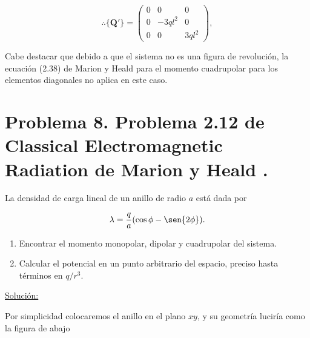\documentclass[a4paper,11pt]{article}
\numberwithin{equation}{section}
\begin{document}
\begin{equation}
 \therefore \{ \mathbf{Q'} \} = \begin{pmatrix}
                     0 & 0 & 0 \\
                     0 & -3ql^2 & 0 \\
                     0 & 0 & 3ql^2
                    \end{pmatrix},
\end{equation}

Cabe destacar que debido a que el sistema no es una figura de revolución, 
la ecuación (2.38) de Marion y Heald \cite{marion2} para el momento 
cuadrupolar para los elementos diagonales no aplica en este caso.

\newpage

\section{Problema 8. Problema 2.12 de Classical Electromagnetic Radiation
de Marion y Heald \cite{marion2}.}

La densidad de carga lineal de un anillo de radio $a$ está dada por 

$$
\lambda = \frac{q}{a}(\cos{\phi} - \sen{2\phi}).
$$

\begin{enumerate}[label=\textbf{(\alph*)}]
\item Encontrar el momento monopolar, dipolar y cuadrupolar del sistema.
\item Calcular el potencial en un punto arbitrario del espacio, preciso hasta 
términos en $q/r^3$.
\end{enumerate}

\vspace{.3cm}

\underline{Solución:} \vspace{.3cm}


Por simplicidad colocaremos el anillo en el plano $xy$, y su geometría luciría 
como la figura de abajo 
\end{document}
